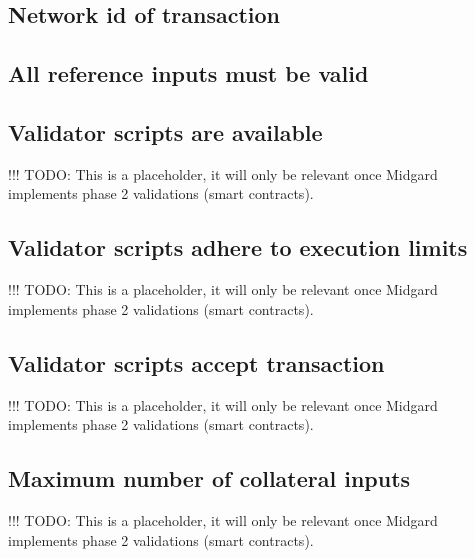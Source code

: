 \documentclass[../main.tex]{subfiles}
\begin{document}
\subsection{Network id of transaction}

\subsection{All reference inputs must be valid}


\subsection{Validator scripts are available}

!!! TODO: This is a placeholder, it will only be relevant once Midgard implements phase 2 validations (smart contracts).

\subsection{Validator scripts adhere to execution limits}

!!! TODO: This is a placeholder, it will only be relevant once Midgard implements phase 2 validations (smart contracts).

\subsection{Validator scripts accept transaction}

!!! TODO: This is a placeholder, it will only be relevant once Midgard implements phase 2 validations (smart contracts).

\subsection{Maximum number of collateral inputs}

!!! TODO: This is a placeholder, it will only be relevant once Midgard implements phase 2 validations (smart contracts).
\end{document}
